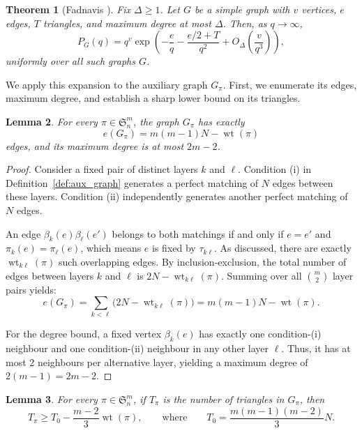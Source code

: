 \documentclass[10pt,a4paper]{amsart}
\newtheorem{theorem}{Theorem}[section]
\newtheorem{lemma}[theorem]{Lemma}
\renewcommand\geq{\geqslant}
\renewcommand\to{\rightarrow}
\newcommand{\wt}{\operatorname{wt}}
\begin{document}
\begin{theorem}[Fadnavis \cite{Fadnavis}]\label{thm:fadnavis_expansion}
Fix $\Delta\geq1$. Let $G$ be a simple graph with $v$ vertices, $e$ edges, $T$ triangles, and maximum degree at most $\Delta$. Then, as $q\to\infty$,
\begin{equation}\label{eq:chromatic_formula}
        P_G(q)=q^v\exp\left( -\frac eq-\frac{e/2+T}{q^2}+O_\Delta\left(\frac v{q^3}\right) \right),
\end{equation}
uniformly over all such graphs $G$.
\end{theorem}

We apply this expansion to the auxiliary graph $G_\pi$. First, we enumerate its edges, maximum degree, and establish a sharp lower bound on its triangles.

\begin{lemma}\label{lem:aux_basic}
For every $\pi\in\mathfrak S_n^m$, the graph $G_\pi$ has exactly 
$$e(G_\pi)=m(m-1)N-\wt(\pi)$$
edges, and its maximum degree is at most $2m-2$.
\end{lemma}

\begin{proof}
Consider a fixed pair of distinct layers $k$ and $\ell$. Condition \textup{(i)} in Definition~\ref{def:aux_graph} generates a perfect matching of $N$ edges between these layers. Condition \textup{(ii)} independently generates another perfect matching of $N$ edges. 

An edge $\beta_k(e)\beta_\ell(e')$ belongs to both matchings if and only if $e=e'$ and $\pi_k(e)=\pi_\ell(e)$, which means $e$ is fixed by $\tau_{k\ell}$. As discussed, there are exactly $\wt_{k\ell}(\pi)$ such overlapping edges. By inclusion-exclusion, the total number of edges between layers $k$ and $\ell$ is $2N-\wt_{k\ell}(\pi)$. Summing over all $\binom m2$ layer pairs yields:
\[
        e(G_\pi)=\sum_{k<\ell}\bigl(2N-\wt_{k\ell}(\pi)\bigr) =m(m-1)N-\wt(\pi).
\]

For the degree bound, a fixed vertex $\beta_k(e)$ has exactly one condition-\textup{(i)} neighbour and one condition-\textup{(ii)} neighbour in any other layer $\ell$. Thus, it has at most 2 neighbours per alternative layer, yielding a maximum degree of $2(m-1) = 2m-2$.
\end{proof}

\begin{lemma}\label{lem:triangle_bound}
For every $\pi\in\mathfrak S_n^m$, if $T_\pi$ is the number of triangles in $G_\pi$, then
\begin{equation}\label{eq:triangle_lower_bound}
T_\pi\geq T_0-\frac{m-2}{3}\wt(\pi), \qquad\text{where}\qquad T_0=\frac{m(m-1)(m-2)}3N.
\end{equation}
\end{lemma}
\end{document}
